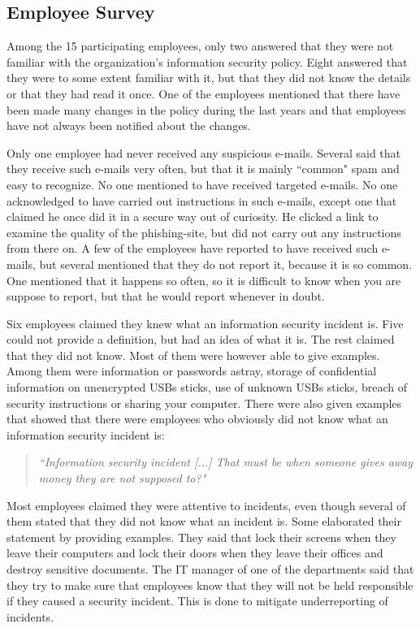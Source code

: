 \subsection{Employee Survey}
Among the 15 participating employees, only two answered that they were not familiar with the organization's information security policy. Eight answered that they were to some extent familiar with it, but that they did not know the details or that they had read it once. One of the employees mentioned that there have been made many changes in the policy during the last years and that employees have not always been notified about the changes.

Only one employee had never received any suspicious e-mails. Several said that they receive such e-mails very often, but that it is mainly ``common" spam and easy to recognize. No one mentioned to have received targeted e-mails. No one acknowledged to have carried out instructions in such e-mails, except one that claimed he once did it in a secure way out of curiosity. He clicked a link to examine the quality of the phishing-site, but did not carry out any instructions from there on. A few of the employees have reported to have received such e-mails, but several mentioned that they do not report it, because it is so common. One mentioned that it happens so often, so it is difficult to know when you are suppose to report, but that he would report whenever in doubt.

Six employees claimed they knew what an information security incident is. Five could not provide a definition, but had an idea of what it is. The rest claimed that they did not know. Most of them were however able to give examples. Among them were information or passwords astray, storage of confidential information on unencrypted \acsp{USB} sticks, use of unknown \acsp{USB} sticks, breach of security instructions or sharing your computer. There were also given examples that showed that there were employees who obviously did not know what an information security incident is:

\begin{quote}
\textit{``Information security incident [...] That must be when someone gives away money they are not supposed to?"}
\end{quote}

Most employees claimed they were attentive to incidents, even though several of them stated that they did not know what an incident is. Some elaborated their statement by providing examples. They said that lock their screens when they leave their computers and lock their doors when they leave their offices and destroy sensitive documents. The IT manager of one of the departments said that they try to make sure that employees know that they will not be held responsible if they caused a security incident. This is done to mitigate underreporting of incidents.

